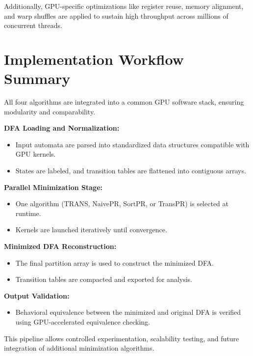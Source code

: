 Additionally, GPU-specific optimizations like register reuse, memory alignment, and warp shuffles are applied to sustain high throughput across millions of concurrent threads.

\section{Implementation Workflow Summary}

All four algorithms are integrated into a common GPU software stack, ensuring modularity and comparability.

\textbf{DFA Loading and Normalization:}
\begin{itemize}
    \item Input automata are parsed into standardized data structures compatible with GPU kernels.
    \item States are labeled, and transition tables are flattened into contiguous arrays.
\end{itemize}

\textbf{Parallel Minimization Stage:}
\begin{itemize}
    \item One algorithm (TRANS, NaivePR, SortPR, or TransPR) is selected at runtime.
    \item Kernels are launched iteratively until convergence.
\end{itemize}

\textbf{Minimized DFA Reconstruction:}
\begin{itemize}
    \item The final partition array is used to construct the minimized DFA.
    \item Transition tables are compacted and exported for analysis.
\end{itemize}

\textbf{Output Validation:}
\begin{itemize}
    \item Behavioral equivalence between the minimized and original DFA is verified using GPU-accelerated equivalence checking.
\end{itemize}

This pipeline allows controlled experimentation, scalability testing, and future integration of additional minimization algorithms.

